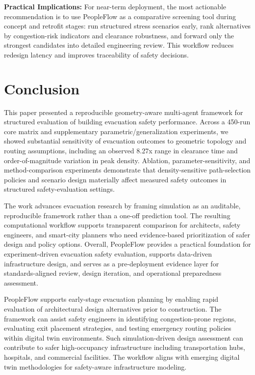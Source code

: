 \documentclass[nolineno]{ieeeaccess}
\begin{document}
\noindent\textbf{Practical Implications:} For near-term deployment, the most actionable recommendation is to use PeopleFlow as a comparative screening tool during concept and retrofit stages: run structured stress scenarios early, rank alternatives by congestion-risk indicators and clearance robustness, and forward only the strongest candidates into detailed engineering review. This workflow reduces redesign latency and improves traceability of safety decisions.

\section{Conclusion}
This paper presented a reproducible geometry-aware multi-agent framework for structured evaluation of building evacuation safety performance. Across a 450-run core matrix and supplementary parametric/generalization experiments, we showed substantial sensitivity of evacuation outcomes to geometric topology and routing assumptions, including an observed 8.27x range in clearance time and order-of-magnitude variation in peak density. Ablation, parameter-sensitivity, and method-comparison experiments demonstrate that density-sensitive path-selection policies and scenario design materially affect measured safety outcomes in structured safety-evaluation settings.

The work advances evacuation research by framing simulation as an auditable, reproducible framework rather than a one-off prediction tool. The resulting computational workflow supports transparent comparison for architects, safety engineers, and smart-city planners who need evidence-based prioritization of safer design and policy options. Overall, PeopleFlow provides a practical foundation for experiment-driven evacuation safety evaluation, supports data-driven infrastructure design, and serves as a pre-deployment evidence layer for standards-aligned review, design iteration, and operational preparedness assessment.

PeopleFlow supports early-stage evacuation planning by enabling rapid evaluation of architectural design alternatives prior to construction. The framework can assist safety engineers in identifying congestion-prone regions, evaluating exit placement strategies, and testing emergency routing policies within digital twin environments. Such simulation-driven design assessment can contribute to safer high-occupancy infrastructure including transportation hubs, hospitals, and commercial facilities. The workflow aligns with emerging digital twin methodologies for safety-aware infrastructure modeling.
\end{document}
